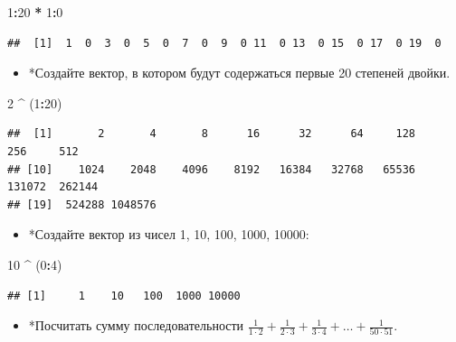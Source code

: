 \documentclass[]{book}
\newenvironment{Shaded}{\begin{snugshade}}{\end{snugshade}}
\newcommand{\DecValTok}[1]{\textcolor[rgb]{0.00,0.00,0.81}{#1}}
\newcommand{\StringTok}[1]{\textcolor[rgb]{0.31,0.60,0.02}{#1}}
\newcommand{\OperatorTok}[1]{\textcolor[rgb]{0.81,0.36,0.00}{\textbf{#1}}}
\newcommand{\NormalTok}[1]{#1}
\providecommand{\tightlist}{%
  \setlength{\itemsep}{0pt}\setlength{\parskip}{0pt}}
\begin{document}
\begin{Shaded}
\begin{Highlighting}[]
\DecValTok{1}\OperatorTok{:}\DecValTok{20} \OperatorTok{*}\StringTok{ }\DecValTok{1}\OperatorTok{:}\DecValTok{0}
\end{Highlighting}
\end{Shaded}

\begin{verbatim}
##  [1]  1  0  3  0  5  0  7  0  9  0 11  0 13  0 15  0 17  0 19  0
\end{verbatim}

\begin{itemize}
\tightlist
\item
  *Создайте вектор, в котором будут содержаться первые 20 степеней
  двойки.
\end{itemize}

\begin{Shaded}
\begin{Highlighting}[]
\DecValTok{2} \OperatorTok{^}\StringTok{ }\NormalTok{(}\DecValTok{1}\OperatorTok{:}\DecValTok{20}\NormalTok{)}
\end{Highlighting}
\end{Shaded}

\begin{verbatim}
##  [1]       2       4       8      16      32      64     128     256     512
## [10]    1024    2048    4096    8192   16384   32768   65536  131072  262144
## [19]  524288 1048576
\end{verbatim}

\begin{itemize}
\tightlist
\item
  *Создайте вектор из чисел 1, 10, 100, 1000, 10000:
\end{itemize}

\begin{Shaded}
\begin{Highlighting}[]
\DecValTok{10} \OperatorTok{^}\StringTok{ }\NormalTok{(}\DecValTok{0}\OperatorTok{:}\DecValTok{4}\NormalTok{)}
\end{Highlighting}
\end{Shaded}

\begin{verbatim}
## [1]     1    10   100  1000 10000
\end{verbatim}

\begin{itemize}
\tightlist
\item
  *Посчитать сумму последовательности
  \(\frac{1}{1 \cdot 2}+\frac{1}{2 \cdot 3}+\frac{1}{3 \cdot 4}+\ldots+\frac{1}{50 \cdot 51}\).
\end{itemize}
\end{document}
